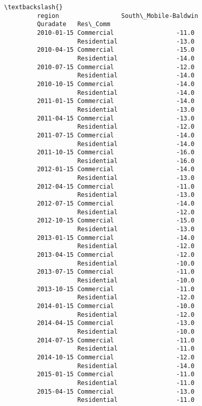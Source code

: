 \documentclass[11pt]{article}
\begin{document}
\begin{Verbatim}[commandchars=\\\{\}]
                                                      \textbackslash{}
         region                 South\_Mobile-Baldwin   
         Quradate   Res\_Comm                           
         2010-01-15 Commercial                 -11.0   
                    Residential                -13.0   
         2010-04-15 Commercial                 -15.0   
                    Residential                -14.0   
         2010-07-15 Commercial                 -12.0   
                    Residential                -14.0   
         2010-10-15 Commercial                 -14.0   
                    Residential                -14.0   
         2011-01-15 Commercial                 -14.0   
                    Residential                -13.0   
         2011-04-15 Commercial                 -13.0   
                    Residential                -12.0   
         2011-07-15 Commercial                 -14.0   
                    Residential                -14.0   
         2011-10-15 Commercial                 -16.0   
                    Residential                -16.0   
         2012-01-15 Commercial                 -14.0   
                    Residential                -13.0   
         2012-04-15 Commercial                 -11.0   
                    Residential                -13.0   
         2012-07-15 Commercial                 -14.0   
                    Residential                -12.0   
         2012-10-15 Commercial                 -15.0   
                    Residential                -13.0   
         2013-01-15 Commercial                 -14.0   
                    Residential                -12.0   
         2013-04-15 Commercial                 -12.0   
                    Residential                -10.0   
         2013-07-15 Commercial                 -11.0   
                    Residential                -10.0   
         2013-10-15 Commercial                 -11.0   
                    Residential                -12.0   
         2014-01-15 Commercial                 -10.0   
                    Residential                -12.0   
         2014-04-15 Commercial                 -13.0   
                    Residential                -10.0   
         2014-07-15 Commercial                 -11.0   
                    Residential                -11.0   
         2014-10-15 Commercial                 -12.0   
                    Residential                -14.0   
         2015-01-15 Commercial                 -11.0   
                    Residential                -11.0   
         2015-04-15 Commercial                 -13.0   
                    Residential                -11.0   

\end{Verbatim}
\end{document}
